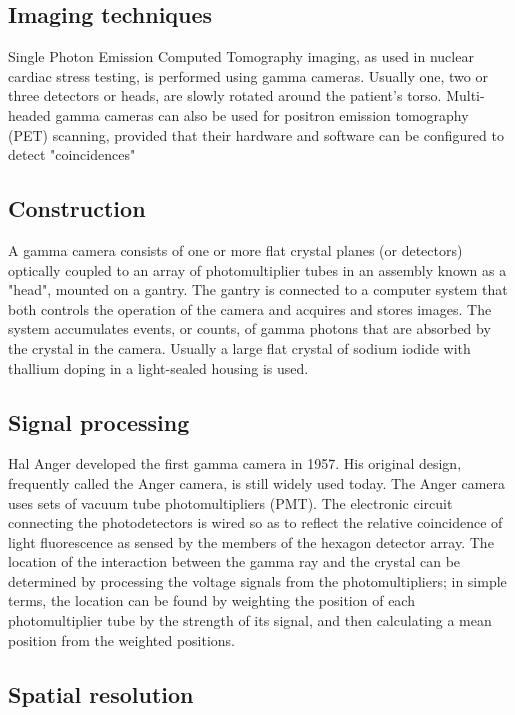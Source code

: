 \documentclass[12pt]{article}
\begin{document}
\subsection{Imaging techniques}
Single Photon Emission Computed Tomography imaging, as used in nuclear cardiac stress testing, is performed using gamma cameras. Usually one, two or three detectors or heads, are slowly rotated around the patient's torso.\newline 
Multi-headed gamma cameras can also be used for positron emission tomography (PET) scanning, provided that their hardware and software can be configured to detect "coincidences" 


\subsection{Construction}
A gamma camera consists of one or more flat crystal planes (or detectors) optically coupled to an array of photomultiplier tubes in an assembly known as a "head", mounted on a gantry. The gantry is connected to a computer system that both controls the operation of the camera and acquires and stores images.\newline
The system accumulates events, or counts, of gamma photons that are absorbed by the crystal in the camera. Usually a large flat crystal of sodium iodide with thallium doping in a light-sealed housing is used.

\subsection{Signal processing}
Hal Anger developed the first gamma camera in 1957. His original design, frequently called the Anger camera, is still widely used today. The Anger camera uses sets of vacuum tube photomultipliers (PMT). The electronic circuit connecting the photodetectors is wired so as to reflect the relative coincidence of light fluorescence as sensed by the members of the hexagon detector array.
\newline\newline
The location of the interaction between the gamma ray and the crystal can be determined by processing the voltage signals from the photomultipliers; in simple terms, the location can be found by weighting the position of each photomultiplier tube by the strength of its signal, and then calculating a mean position from the weighted positions.

\subsection{Spatial resolution}
\end{document}
